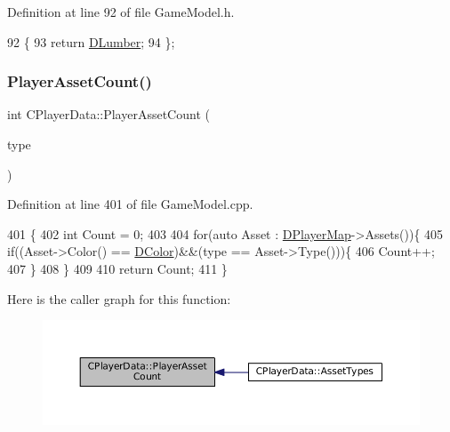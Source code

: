 Definition at line 92 of file Game\+Model.\+h.


\begin{DoxyCode}
92                           \{
93             \textcolor{keywordflow}{return} \hyperlink{classCPlayerData_adf3bf2fa49b5c8a4fb9a478d95f688c4}{DLumber};  
94         \};
\end{DoxyCode}
\hypertarget{classCPlayerData_a3fe55bd902f7a819c0689825d8ad3e4c}{}\label{classCPlayerData_a3fe55bd902f7a819c0689825d8ad3e4c} 
\subsubsection{\texorpdfstring{Player\+Asset\+Count()}{PlayerAssetCount()}}
{\footnotesize\ttfamily int C\+Player\+Data\+::\+Player\+Asset\+Count (\begin{DoxyParamCaption}\item[{\hyperlink{GameDataTypes_8h_a5600d4fc433b83300308921974477fec}{E\+Asset\+Type}}]{type }\end{DoxyParamCaption})}



Definition at line 401 of file Game\+Model.\+cpp.


\begin{DoxyCode}
401                                                 \{
402     \textcolor{keywordtype}{int} Count = 0;
403     
404     \textcolor{keywordflow}{for}(\textcolor{keyword}{auto} Asset : \hyperlink{classCPlayerData_a452163191cd4603e1e38dd8d4bb9691c}{DPlayerMap}->Assets())\{
405         \textcolor{keywordflow}{if}((Asset->Color() == \hyperlink{classCPlayerData_a65d69aaa09c8fc0f7ddfa5e858313085}{DColor})&&(type == Asset->Type()))\{
406             Count++;
407         \}
408     \}
409     
410     \textcolor{keywordflow}{return} Count;
411 \}
\end{DoxyCode}
Here is the caller graph for this function\+:
\nopagebreak
\begin{figure}[H]
\begin{center}
\leavevmode
\includegraphics[width=350pt]{classCPlayerData_a3fe55bd902f7a819c0689825d8ad3e4c_icgraph}
\end{center}
\end{figure}
\hypertarget{classCPlayerData_a9a54d695ff57c633dfb3a18c98408c54}{}\label{classCPlayerData_a9a54d695ff57c633dfb3a18c98408c54} 
